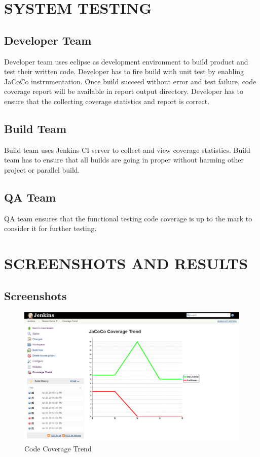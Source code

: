 \documentclass[a4paper,oneside,1,english1pt]{report}
\begin{document}
\chapter{\uppercase{System Testing}}
	\section[Developer Team]{Developer Team}
		\par Developer team uses eclipse as development environment to build product and test their written code. Developer has to fire build with unit test by enabling JaCoCo instrumentation.
		Once build succeed without error and test failure, code coverage report will be available in report output  directory. Developer has to ensure that the collecting coverage statistics and report is correct.
	\section[Build Team]{Build Team}
		\par Build team uses Jenkins \ac{CI} server to collect and view coverage statistics. Build team has to ensure that all builds are going in proper without harming other project or parallel build.
	\section[QA Team]{QA Team}
		\par QA team ensures that the functional testing code coverage is up to the mark to consider it for further testing.
\chapter{\uppercase{Screenshots and Results}}
	\section{Screenshots}
		\begin{figure}[h]
			\includegraphics[width=\linewidth]{screenshots/CoverageTrend.png}
			\caption{Code Coverage Trend}
			
		\end{figure}
		
\end{document}
